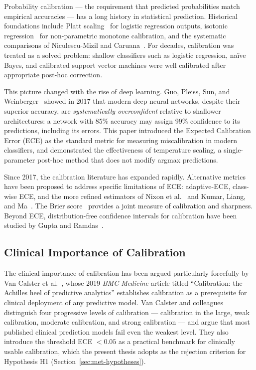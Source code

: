 Probability calibration --- the requirement that predicted 
probabilities match empirical accuracies --- has a long history in 
statistical prediction. Historical foundations include Platt 
scaling~\cite{platt1999} for logistic regression outputs, isotonic 
regression~\cite{zadrozny2002isotonic} for non-parametric monotone 
calibration, and the systematic comparisons of Niculescu-Mizil and 
Caruana~\cite{niculescu2005}. For decades, calibration was treated as 
a solved problem: shallow classifiers such as logistic regression, 
naïve Bayes, and calibrated support vector machines were well 
calibrated after appropriate post-hoc correction.

This picture changed with the rise of deep learning. Guo, Pleiss, Sun, 
and Weinberger~\cite{guo2017calibration} showed in 2017 that modern 
deep neural networks, despite their superior accuracy, are 
\emph{systematically overconfident} relative to shallower architectures: 
a network with 85\% accuracy may assign 99\% confidence to its 
predictions, including its errors. This paper introduced the Expected 
Calibration Error (ECE) as the standard metric for measuring 
miscalibration in modern classifiers, and demonstrated the 
effectiveness of temperature scaling, a single-parameter post-hoc 
method that does not modify argmax predictions.

Since 2017, the calibration literature has expanded rapidly. 
Alternative metrics have been proposed to address specific limitations 
of ECE: adaptive-ECE, class-wise ECE, and the more refined estimators 
of Nixon et al.~\cite{nixon2019measuring} and Kumar, Liang, and 
Ma~\cite{kumar2019verified}. The Brier score~\cite{brier1950} provides 
a joint measure of calibration and sharpness. Beyond ECE, 
distribution-free confidence intervals for calibration have been 
studied by Gupta and Ramdas~\cite{gupta2021distributionfree}.

\subsection{Clinical Importance of Calibration}
\label{subsec:sota-clinical-calib}

The clinical importance of calibration has been argued particularly 
forcefully by Van Calster et al.~\cite{vancalster2019calibration}, 
whose 2019 \emph{BMC Medicine} article titled ``Calibration: the 
Achilles heel of predictive analytics'' establishes calibration as a 
prerequisite for clinical deployment of any predictive model. Van 
Calster and colleagues distinguish four progressive levels of 
calibration --- calibration in the large, weak calibration, moderate 
calibration, and strong calibration --- and argue that most published 
clinical prediction models fail even the weakest level. They also 
introduce the threshold ECE $< 0.05$ as a practical benchmark for 
clinically usable calibration, which the present thesis adopts as the 
rejection criterion for Hypothesis H1 (Section~\ref{sec:met-hypotheses}).

